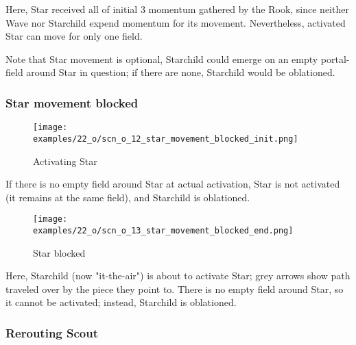 Here, Star received all of initial 3 momentum gathered by the Rook, since neither
Wave nor Starchild expend momentum for its movement. Nevertheless, activated Star
can move for only one field.

Note that Star movement is optional, Starchild could emerge on an empty portal-field
around Star in question; if there are none, Starchild would be oblationed.

\clearpage %

\subsubsection*{Star movement blocked}
\label{sec:One/Starchild/Movement/Star movement blocked}

\noindent
\begin{wrapfigure}[4]{l}{0.4\textwidth}
\centering
\texttt{[image: examples/22\_o/scn\_o\_12\_star\_movement\_blocked\_init.png]}
\caption{Activating Star}
\label{fig:scn_o_12_star_movement_blocked_init}
\end{wrapfigure}
If there is no empty field around Star at actual activation, Star is not activated
(it remains at the same field), and Starchild is oblationed.

\vspace*{4.1\baselineskip}
\noindent
\begin{wrapfigure}[7]{l}{0.4\textwidth}
\centering
\texttt{[image: examples/22\_o/scn\_o\_13\_star\_movement\_blocked\_end.png]}
\caption{Star blocked}
\label{fig:scn_o_13_star_movement_blocked_end}
\end{wrapfigure}
Here, Starchild (now "it-the-air") is about to activate Star; grey arrows show path
traveled over by the piece they point to. There is no empty field around Star, so it
cannot be activated; instead, Starchild is oblationed.

\subsubsection*{Rerouting Scout}
\label{sec:One/Starchild/Movement/Rerouting Scout}

